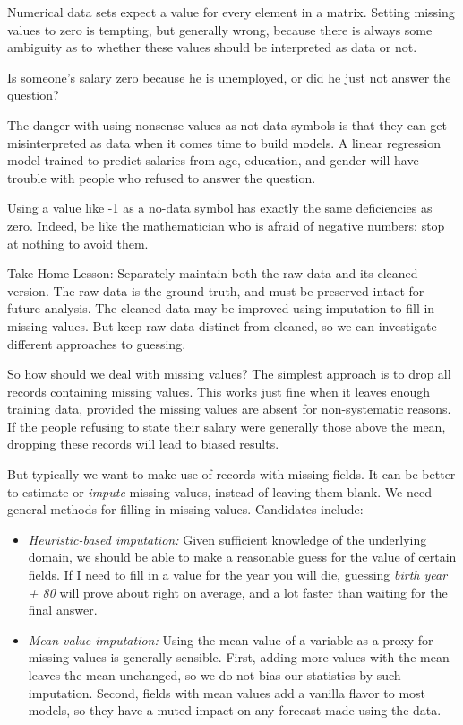 \documentclass[10pt]{article}
\begin{document}
Numerical data sets expect a value for every element in a matrix. Setting missing values to zero is tempting, but generally wrong, because there is always some ambiguity as to whether these values should be interpreted as data or not.

Is someone's salary zero because he is unemployed, or did he just not answer the question?

The danger with using nonsense values as not-data symbols is that they can get misinterpreted as data when it comes time to build models. A linear regression model trained to predict salaries from age, education, and gender will have trouble with people who refused to answer the question.

Using a value like -1 as a no-data symbol has exactly the same deficiencies as zero. Indeed, be like the mathematician who is afraid of negative numbers: stop at nothing to avoid them.

Take-Home Lesson: Separately maintain both the raw data and its cleaned version. The raw data is the ground truth, and must be preserved intact for future analysis. The cleaned data may be improved using imputation to fill in missing values. But keep raw data distinct from cleaned, so we can investigate different approaches to guessing.

So how should we deal with missing values? The simplest approach is to drop all records containing missing values. This works just fine when it leaves enough training data, provided the missing values are absent for non-systematic reasons. If the people refusing to state their salary were generally those above the mean, dropping these records will lead to biased results.

But typically we want to make use of records with missing fields. It can be better to estimate or \textit{impute} missing values, instead of leaving them blank. We need general methods for filling in missing values. Candidates include:

\begin{itemize}
    \item \textit{Heuristic-based imputation:} Given sufficient knowledge of the underlying domain, we should be able to make a reasonable guess for the value of certain fields. If I need to fill in a value for the year you will die, guessing \textit{birth year + 80} will prove about right on average, and a lot faster than waiting for the final answer.
    \item \textit{Mean value imputation:} Using the mean value of a variable as a proxy for missing values is generally sensible. First, adding more values with the mean leaves the mean unchanged, so we do not bias our statistics by such imputation. Second, fields with mean values add a vanilla flavor to most models, so they have a muted impact on any forecast made using the data.
\end{itemize}
\end{document}
